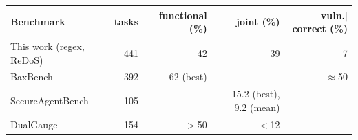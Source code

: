 \begin{tabular}{lrrrr}
\toprule
Benchmark & tasks & functional (\%) & joint (\%) & vuln.$\mid$correct (\%) \\
\midrule
This work (regex, ReDoS) & 441 & 42 & 39 & 7 \\
BaxBench \citep{vero2025baxbench} & 392 & 62 (best) & --- & $\approx$50 \\
SecureAgentBench \citep{chen2025secureagentbench} & 105 & --- & 15.2 (best), 9.2 (mean) & --- \\
DualGauge \citep{patir2025dualgauge} & 154 & $>$50 & $<$12 & --- \\
\bottomrule
\end{tabular}
